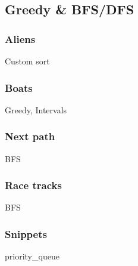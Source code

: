 \documentclass[10pt,a4paper,landscape,twocolumn,twoside]{article}
\begin{document}

	\subsection{Greedy \& BFS/DFS}

		\subsubsection{Aliens}
		\begin{keywords}Custom sort\end{keywords}
		

		\subsubsection{Boats}
		\begin{keywords}Greedy, Intervals\end{keywords}
		

		\subsubsection{Next path}
		\begin{keywords}BFS\end{keywords}
		

		\subsubsection{Race tracks}
		\begin{keywords}BFS\end{keywords}
		

		\subsubsection{Snippets}
		\begin{keywords}priority\_queue\end{keywords}
		
\end{document}
